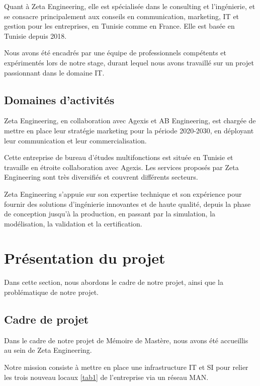 Quant à Zeta Engineering, elle est spécialisée dans le consulting et l'ingénierie, et se consacre principalement aux conseils en communication, marketing, IT et gestion pour les entreprises, en Tunisie comme en France. Elle est basée en Tunisie depuis 2018.

Nous avons été encadrés par une équipe de professionnels compétents et expérimentés lors de notre stage, durant lequel nous avons travaillé sur un projet passionnant dans le domaine IT.

\subsection{Domaines d'activités}
Zeta Engineering, en collaboration avec Agexis et AB Engineering, est chargée de mettre en place leur stratégie marketing pour la période 2020-2030, en déployant leur communication et leur commercialisation.

Cette entreprise de bureau d'études multifonctions est située en Tunisie et travaille en étroite collaboration avec Agexis. Les services proposés par Zeta Engineering sont très diversifiés et couvrent différents secteurs.

Zeta Engineering s'appuie sur son expertise technique et son expérience pour fournir des solutions d'ingénierie innovantes et de haute qualité, depuis la phase de conception jusqu'à la production, en passant par la simulation, la modélisation, la validation et la certification. 

\section{Présentation du projet}

Dans cette section, nous abordons le cadre de notre projet, ainsi que la problématique de notre projet.

\subsection{Cadre de projet}
Dans le cadre de notre projet de Mémoire de Mastère, nous avons été accueillis au sein de Zeta Engineering. 

Notre mission consiste à mettre en place une infrastructure IT et SI pour relier les trois nouveau locaux \ref{tab1} de l'entreprise via un réseau MAN.\\


